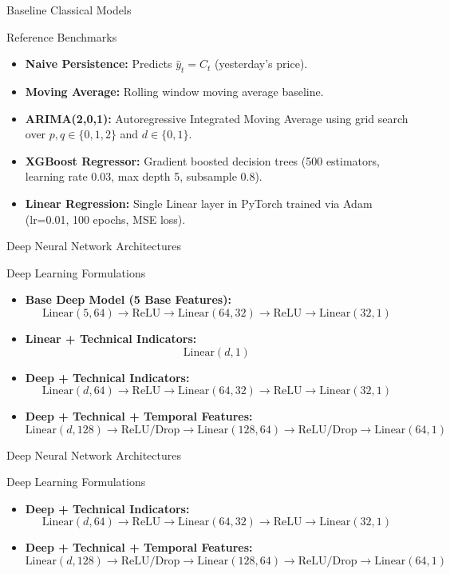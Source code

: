\documentclass[aspectratio=169]{beamer}
\begin{document}
\begin{frame}{Baseline Classical Models}
	\begin{block}{Reference Benchmarks}
		\begin{itemize}
			\item \textbf{Naive Persistence:} Predicts $\hat{y}_t = C_t$ (yesterday's price).
			\item \textbf{Moving Average:} Rolling window moving average baseline.
			\item \textbf{ARIMA(2,0,1):} Autoregressive Integrated Moving Average using grid search over $p,q \in \{0,1,2\}$ and $d \in \{0,1\}$.
			\item \textbf{XGBoost Regressor:} Gradient boosted decision trees (500 estimators, learning rate 0.03, max depth 5, subsample 0.8).
			\item \textbf{Linear Regression:} Single Linear layer in PyTorch trained via Adam (lr=0.01, 100 epochs, MSE loss).
		\end{itemize}
	\end{block}
\end{frame}

\begin{frame}{Deep Neural Network Architectures}
	\begin{block}{Deep Learning Formulations}
		\begin{itemize}
			\item \textbf{Base Deep Model (5 Base Features):}
				$$\text{Linear}(5, 64) \rightarrow \text{ReLU} \rightarrow \text{Linear}(64, 32) \rightarrow \text{ReLU} \rightarrow \text{Linear}(32, 1)$$
			\item \textbf{Linear + Technical Indicators:}
				$$\text{Linear}(d, 1)$$
			\item \textbf{Deep + Technical Indicators:}
				$$\text{Linear}(d, 64) \rightarrow \text{ReLU} \rightarrow \text{Linear}(64, 32) \rightarrow \text{ReLU} \rightarrow \text{Linear}(32, 1)$$
			\item \textbf{Deep + Technical + Temporal Features:}
				$$\text{Linear}(d, 128) \rightarrow \text{ReLU/Drop} \rightarrow \text{Linear}(128, 64) \rightarrow \text{ReLU/Drop} \rightarrow \text{Linear}(64, 1)$$
		\end{itemize}
	\end{block}
\end{frame}

\begin{frame}{Deep Neural Network Architectures}
	\begin{block}{Deep Learning Formulations}
		\begin{itemize}
			\item \textbf{Deep + Technical Indicators:}
				$$\text{Linear}(d, 64) \rightarrow \text{ReLU} \rightarrow \text{Linear}(64, 32) \rightarrow \text{ReLU} \rightarrow \text{Linear}(32, 1)$$
			\item \textbf{Deep + Technical + Temporal Features:}
				$$\text{Linear}(d, 128) \rightarrow \text{ReLU/Drop} \rightarrow \text{Linear}(128, 64) \rightarrow \text{ReLU/Drop} \rightarrow \text{Linear}(64, 1)$$
		\end{itemize}
	\end{block}
\end{frame}
\end{document}
